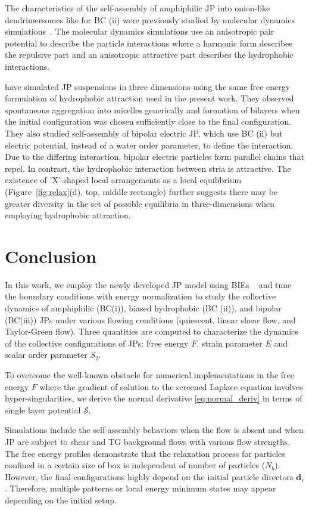 \documentclass[prb,preprint,showpacs,preprintnumbers,amsmath,amssymb,longbibliography]{revtex4-1}
\newcommand{\dd}{\mathbf{d}}
\newcommand{\SSS}{\mathcal{S}}
\begin{document}
The characteristics of the self-assembly of amphiphilic JP into
onion-like dendrimersomes like for BC (ii) were previously studied by molecular dynamics
simulations~\cite{C9NR05885K}. The molecular dynamics simulations use an
anisotropic pair potential to describe the particle interactions
where a harmonic form describes the repulsive part and an anisotropic
attractive part describes the hydrophobic interactions.

\citet{kohl-cor-che-vee22} have simulated JP suspensions in three
dimensions using the same free energy formulation of hydrophobic
attraction used in the present work. They observed spontaneous
aggregation into micelles generically and formation of bilayers when the
initial configuration was chosen sufficiently close to the final
configuration. They also studied self-assembly of bipolar electric JP,
which use BC (ii) but electric potential, instead of a water order parameter,
to define the interaction.  Due to the differing interaction,
bipolar electric particles form parallel chains that
repel. In contrast, the hydrophobic interaction between stria is
attractive. The existence of 'X'-shaped local arrangements as a local
equilibrium (Figure~\ref{fig:relax}(d), top, middle rectangle) further
suggests there may be greater diversity in the set of possible
equilibria in three-dimensions when employing hydrophobic attraction.


\section{Conclusion}
\label{sec:conclusion}


In this work, we employ the newly developed JP model using BIEs ~\cite{Fu20, Fu2022_JFM} 
and tune the boundary conditions with energy normalization to study the  collective dynamics of 
amphiphilic (BC(i)), biased hydrophobic (BC (ii)), and bipolar (BC(iii)) JPs under various flowing conditions (quiescent, linear shear flow, and Taylor-Green flow).
Three quantities are computed to characterize the dynamics of the collective configurations of JPs: Free energy $F$, strain parameter $E$ and 
scalar order parameter $S_2$. 

To overcome the well-known 
obstacle for numerical implementations in the free energy $F$ where the gradient of 
solution to the screened Laplace equation involves hyper-singularities, we derive the normal 
derivative \eqref{eq:normal_deriv} in terms of single layer potential $\SSS$.

Simulations include the self-assembly behaviors when the flow is absent and
when JP are subject to shear and TG background flows with various 
flow strengths. The free energy profiles demonstrate that the relaxation process for 
particles confined in a certain size of box is independent of number of particles 
($N_b$). However, the final configurations highly depend on the initial particle 
directors $\dd_i$. Therefore, multiple patterns or local energy minimum states may 
appear depending on the initial setup.
\end{document}

